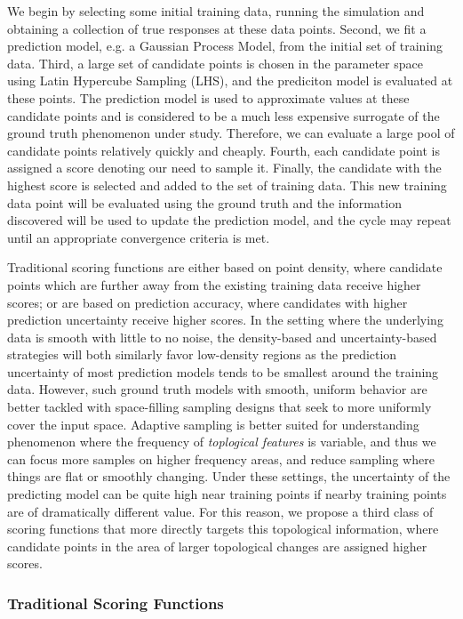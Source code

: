 We begin by selecting some initial training data, running the simulation and obtaining a collection of true responses at these data points.
%
Second, we fit a prediction model, e.g. a Gaussian Process Model, from the initial set of training data.
%
Third, a large set of candidate points is chosen in the parameter space using Latin Hypercube Sampling (LHS), and the prediciton model is evaluated at these points.
%
The prediction model is used to approximate values at these candidate points and is considered to be a much less expensive surrogate of the ground truth phenomenon under study.
%
Therefore, we can evaluate a large pool of candidate points relatively quickly and cheaply.
%
Fourth, each candidate point is assigned a score denoting our need to sample it.
%
Finally, the candidate with the highest score is selected and added to the set of training data.
%
This new training data point will be evaluated using the ground truth and the information discovered will be used to update the prediction model, and the cycle may repeat until an appropriate convergence criteria is met.

Traditional scoring functions are either based on point density, where candidate points which are further away from the existing training data receive higher scores; or are based on prediction accuracy, where candidates with higher prediction uncertainty receive higher scores.
%
In the setting where the underlying data is smooth with little to no noise, the density-based and uncertainty-based strategies will both similarly favor low-density regions as the prediction uncertainty of most prediction models tends to be smallest around the training data.
%
However, such ground truth models with smooth, uniform behavior are better tackled with space-filling sampling designs that seek to more uniformly cover the input space.
%
Adaptive sampling is better suited for understanding phenomenon where the frequency of \emph{toplogical features} is variable, and thus we can focus more samples on higher frequency areas, and reduce sampling where things are flat or smoothly changing.
%
Under these settings, the uncertainty of the predicting model can be quite high near training points if nearby training points are of dramatically different value.
%
For this reason, we propose a third class of scoring functions that more directly targets this topological
information, where candidate points in the area of larger topological changes are assigned higher scores.

\subsubsection{Traditional Scoring Functions}
\label{sec:classic}

